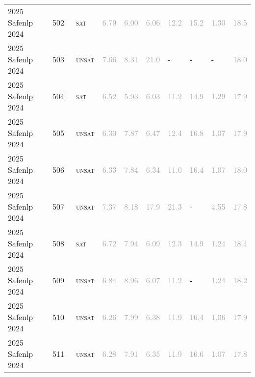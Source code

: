\begin{center}
{\begin{longtable}{@{}llllllllll@{}}
2025 Safenlp 2024 & 502 & ~\textsc{sat} & \textcolor{darkgray}{6.79} & \textcolor{darkgray}{6.00} & \textcolor{darkgray}{6.06} & \textcolor{darkgray}{12.2} & \textcolor{darkgray}{15.2} & \textcolor{darkgray}{1.30} & \textcolor{darkgray}{18.5} \\
2025 Safenlp 2024 & 503 & ~\textsc{unsat} & \textcolor{darkgray}{7.66} & \textcolor{darkgray}{8.31} & \textcolor{darkgray}{21.0} & - & - & - & \textcolor{darkgray}{18.0} \\
2025 Safenlp 2024 & 504 & ~\textsc{sat} & \textcolor{darkgray}{6.52} & \textcolor{darkgray}{5.93} & \textcolor{darkgray}{6.03} & \textcolor{darkgray}{11.2} & \textcolor{darkgray}{14.9} & \textcolor{darkgray}{1.29} & \textcolor{darkgray}{17.9} \\
2025 Safenlp 2024 & 505 & ~\textsc{unsat} & \textcolor{darkgray}{6.30} & \textcolor{darkgray}{7.87} & \textcolor{darkgray}{6.47} & \textcolor{darkgray}{12.4} & \textcolor{darkgray}{16.8} & \textcolor{darkgray}{1.07} & \textcolor{darkgray}{17.9} \\
2025 Safenlp 2024 & 506 & ~\textsc{unsat} & \textcolor{darkgray}{6.33} & \textcolor{darkgray}{7.84} & \textcolor{darkgray}{6.34} & \textcolor{darkgray}{11.0} & \textcolor{darkgray}{16.4} & \textcolor{darkgray}{1.07} & \textcolor{darkgray}{18.0} \\
2025 Safenlp 2024 & 507 & ~\textsc{unsat} & \textcolor{darkgray}{7.37} & \textcolor{darkgray}{8.18} & \textcolor{darkgray}{17.9} & \textcolor{darkgray}{21.3} & - & \textcolor{darkgray}{4.55} & \textcolor{darkgray}{17.8} \\
2025 Safenlp 2024 & 508 & ~\textsc{sat} & \textcolor{darkgray}{6.72} & \textcolor{darkgray}{7.94} & \textcolor{darkgray}{6.09} & \textcolor{darkgray}{12.3} & \textcolor{darkgray}{14.9} & \textcolor{darkgray}{1.24} & \textcolor{darkgray}{18.4} \\
2025 Safenlp 2024 & 509 & ~\textsc{unsat} & \textcolor{darkgray}{6.84} & \textcolor{darkgray}{8.96} & \textcolor{darkgray}{6.07} & \textcolor{darkgray}{11.2} & - & \textcolor{darkgray}{1.24} & \textcolor{darkgray}{18.2} \\
2025 Safenlp 2024 & 510 & ~\textsc{unsat} & \textcolor{darkgray}{6.26} & \textcolor{darkgray}{7.99} & \textcolor{darkgray}{6.38} & \textcolor{darkgray}{11.9} & \textcolor{darkgray}{16.4} & \textcolor{darkgray}{1.06} & \textcolor{darkgray}{17.9} \\
2025 Safenlp 2024 & 511 & ~\textsc{unsat} & \textcolor{darkgray}{6.28} & \textcolor{darkgray}{7.91} & \textcolor{darkgray}{6.35} & \textcolor{darkgray}{11.9} & \textcolor{darkgray}{16.6} & \textcolor{darkgray}{1.07} & \textcolor{darkgray}{17.8} \\

\end{longtable}}
\end{center}

